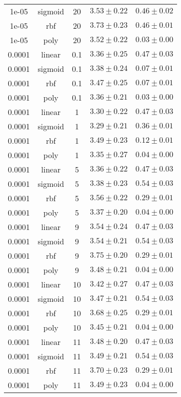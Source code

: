 \begin{tabular}{cccrr}
1e-05 & sigmoid & 20 & $3.53 \pm 0.22$ & $0.46 \pm 0.02$\\
1e-05 & rbf & 20 & $3.73 \pm 0.23$ & $0.46 \pm 0.01$\\
1e-05 & poly & 20 & $3.52 \pm 0.22$ & $0.03 \pm 0.00$\\
0.0001 & linear & 0.1 & $3.36 \pm 0.25$ & $0.47 \pm 0.03$\\
0.0001 & sigmoid & 0.1 & $3.38 \pm 0.24$ & $0.07 \pm 0.01$\\
0.0001 & rbf & 0.1 & $3.47 \pm 0.25$ & $0.07 \pm 0.01$\\
0.0001 & poly & 0.1 & $3.36 \pm 0.21$ & $0.03 \pm 0.00$\\
0.0001 & linear & 1 & $3.30 \pm 0.22$ & $0.47 \pm 0.03$\\
0.0001 & sigmoid & 1 & $3.29 \pm 0.21$ & $0.36 \pm 0.01$\\
0.0001 & rbf & 1 & $3.49 \pm 0.23$ & $0.12 \pm 0.01$\\
0.0001 & poly & 1 & $3.35 \pm 0.27$ & $0.04 \pm 0.00$\\
0.0001 & linear & 5 & $3.36 \pm 0.22$ & $0.47 \pm 0.03$\\
0.0001 & sigmoid & 5 & $3.38 \pm 0.23$ & $0.54 \pm 0.03$\\
0.0001 & rbf & 5 & $3.56 \pm 0.22$ & $0.29 \pm 0.01$\\
0.0001 & poly & 5 & $3.37 \pm 0.20$ & $0.04 \pm 0.00$\\
0.0001 & linear & 9 & $3.54 \pm 0.24$ & $0.47 \pm 0.03$\\
0.0001 & sigmoid & 9 & $3.54 \pm 0.21$ & $0.54 \pm 0.03$\\
0.0001 & rbf & 9 & $3.75 \pm 0.20$ & $0.29 \pm 0.01$\\
0.0001 & poly & 9 & $3.48 \pm 0.21$ & $0.04 \pm 0.00$\\
0.0001 & linear & 10 & $3.42 \pm 0.27$ & $0.47 \pm 0.03$\\
0.0001 & sigmoid & 10 & $3.47 \pm 0.21$ & $0.54 \pm 0.03$\\
0.0001 & rbf & 10 & $3.68 \pm 0.25$ & $0.29 \pm 0.01$\\
0.0001 & poly & 10 & $3.45 \pm 0.21$ & $0.04 \pm 0.00$\\
0.0001 & linear & 11 & $3.48 \pm 0.20$ & $0.47 \pm 0.03$\\
0.0001 & sigmoid & 11 & $3.49 \pm 0.21$ & $0.54 \pm 0.03$\\
0.0001 & rbf & 11 & $3.70 \pm 0.23$ & $0.29 \pm 0.01$\\
0.0001 & poly & 11 & $3.49 \pm 0.23$ & $0.04 \pm 0.00$\\

\end{tabular}
